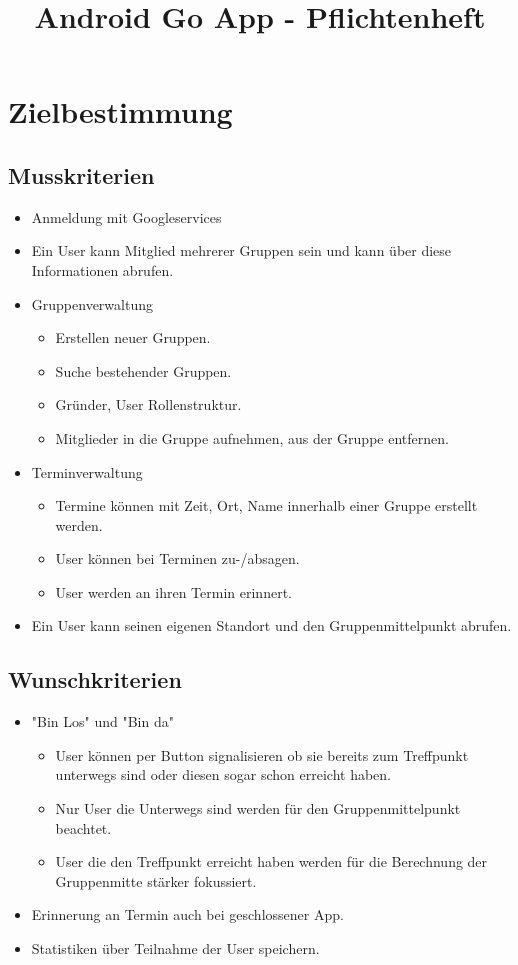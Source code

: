 \documentclass{scrartcl}
\title{Android Go App - Pflichtenheft}
\begin{document}
	\maketitle
	\newpage
	
	\tableofcontents
	\newpage
	
	\section{Zielbestimmung}
	\subsection{Musskriterien}
		\begin{itemize}
		\item Anmeldung mit Googleservices
		\item Ein User kann Mitglied mehrerer Gruppen sein und kann über diese Informationen abrufen.
		\item Gruppenverwaltung
			\begin{itemize}
			\item Erstellen neuer Gruppen.
			\item Suche bestehender Gruppen.
			\item Gründer, User Rollenstruktur.
			\item Mitglieder in die Gruppe aufnehmen, aus der Gruppe entfernen.
			\end{itemize}
		\item Terminverwaltung
			\begin{itemize}
			\item Termine können mit Zeit, Ort, Name innerhalb einer Gruppe erstellt werden.
			\item User können bei Terminen zu-/absagen.
			\item User werden an ihren Termin erinnert.
			\end{itemize}
		\item Ein User kann seinen eigenen Standort und den Gruppenmittelpunkt abrufen.	
		\end{itemize}
	\subsection{Wunschkriterien}
		\begin{itemize}
		\item "Bin Los" und "Bin da"
			\begin{itemize}
			\item User können per Button signalisieren ob sie bereits zum Treffpunkt unterwegs sind oder diesen sogar 	schon erreicht haben.
			\item Nur User die Unterwegs sind werden für den Gruppenmittelpunkt beachtet.
			\item User die den Treffpunkt erreicht haben werden für die Berechnung der Gruppenmitte stärker fokussiert.
			\end{itemize}
		\item Erinnerung an Termin auch bei geschlossener App.
		\item Statistiken über Teilnahme der User speichern.
		\end{itemize}
\end{document}
